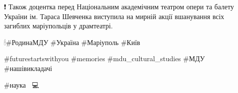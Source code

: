 ❗ Також доцентка перед Національним академічним театром опери та балету
України ім. Тараса Шевченка  виступила на мирній акції вшанування всіх загиблих
маріупольців у драмтеатрі. 

🕯\#РодинаМДУ  \#Україна \#Маріуполь \#Київ

\#futurestartswithyou \#memories \#mdu\_cultural\_studies \#МДУ  \#нашівикладачі

\#наука  📝👨💻😊
